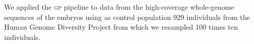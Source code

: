 \documentclass[fleqn,12pt]{wlscirep}
\newcommand{\gp}[]{\textsc{gp }}
\begin{document}
We applied the \gp pipeline to data from the high-coverage whole-genome sequences of the embryos %
using as control population 929 individuals from the Human Genome Diversity Project\cite{bergstrom2019insights} from which we resampled 100 times ten individuals.
\end{document}
